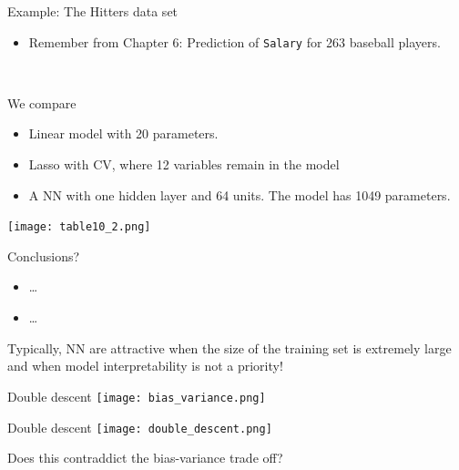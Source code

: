 \documentclass[
  10pt,
  ignorenonframetext,
  twocolumn]{beamer}
\providecommand{\tightlist}{%
  \setlength{\itemsep}{0pt}\setlength{\parskip}{0pt}}
\begin{document}
\begin{frame}[fragile]
\begin{block}{Example: The Hitters data set}
\label{example-the-hitters-data-set}
\(~\)

\begin{itemize}
\tightlist
\item
  Remember from Chapter 6: Prediction of \texttt{Salary} for 263
  baseball players.
\end{itemize}

\(~\)

We compare

\vspace{2mm}

\begin{itemize}
\tightlist
\item
  Linear model with 20 parameters.
\item
  Lasso with CV, where 12 variables remain in the model
\item
  A NN with one hidden layer and 64 units. The model has 1049
  parameters.
\end{itemize}
\end{block}
\end{frame}

\begin{frame}
\texttt{[image: table10\_2.png]} \(~\)

Conclusions?

\begin{itemize}
\tightlist
\item
  \ldots{}
\item
  \ldots{}
\end{itemize}

\vspace{2mm}

\pause

Typically, NN are attractive when the size of the training set is
extremely large and when model interpretability is not a priority!
\end{frame}

\begin{frame}{Double descent}
\label{double-descent}
\texttt{[image: bias\_variance.png]}
\end{frame}

\begin{frame}{Double descent}
\label{double-descent-1}
\texttt{[image: double\_descent.png]}

Does this contraddict the bias-variance trade off?
\end{frame}
\end{document}
